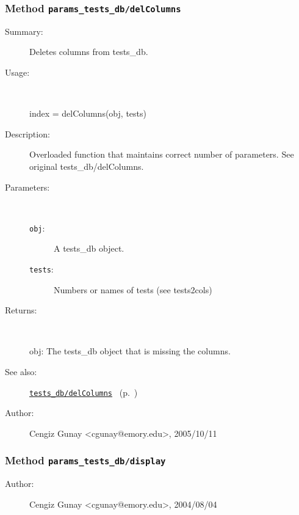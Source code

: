 \subsubsection[Method \texttt{delColumns}]{Method \texttt{params\_tests\_db/delColumns}}%
%
\label{ref_params_tests_db__delColumns}%
\hypertarget{ref_params_tests_db__delColumns}{}%
\begin{description}
\item[Summary:]Deletes columns from tests\_db.
%
\item[Usage:]~%
\begin{lyxcode}%
index = delColumns(obj, tests)
%
\end{lyxcode}%
%
\item[Description:]%
Overloaded function that maintains correct number of parameters. See
 original tests\_db/delColumns.
\item[Parameters:]~
\begin{description}%
\item[\texttt{obj}:]
 A tests\_db object.
\item[\texttt{tests}:]
 Numbers or names of tests (see tests2cols)
\end{description}%
%
\item[Returns:
]~

	obj: The tests\_db object that is missing the columns.
%
%
\item[See also:]%
\hyperlink{ref_tests_db__delColumns}{\texttt{tests\_db/delColumns}}%
\ (p.~\pageref{ref_tests_db__delColumns})%
%
%
\item[Author:]%
Cengiz Gunay <cgunay@emory.edu>, 2005/10/11
%
\end{description}
\methodline%
\subsubsection[Method \texttt{display}]{Method \texttt{params\_tests\_db/display}}%
%
\label{ref_params_tests_db__display}%
\hypertarget{ref_params_tests_db__display}{}%
\begin{description}
%
%
%
%
%
%
%
\item[Author:]%
Cengiz Gunay <cgunay@emory.edu>, 2004/08/04
%
\end{description}
\methodline%
